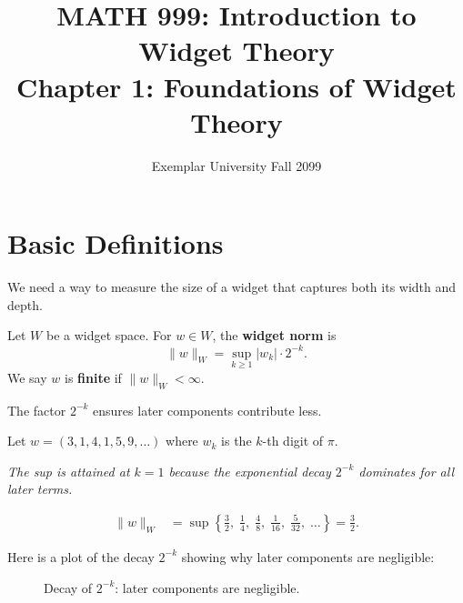 \documentclass[10pt, a4paper]{article}
\title{\textbf{MATH 999: Introduction to Widget Theory}\\[4pt]
  {\Large Chapter 1: Foundations of Widget Theory}}
\author{{\small Exemplar University \quad Fall 2099}}
\date{}
\newcommand{\note}[1]{\par{\small\textit{#1}}\par}
\theoremstyle{definition}
\theoremstyle{remark}
\begin{document}
\maketitle
\thispagestyle{fancy}
\tableofcontents
\newpage


\section{Basic Definitions}

We need a way to measure the size of a widget that captures both its
width and depth.

\begin{defbox}
Let $W$ be a widget space. For $w \in W$, the \textbf{widget norm} is
\[
  \|w\|_W = \sup_{k \ge 1} |w_k| \cdot 2^{-k}.
\]
We say $w$ is \textbf{finite} if $\|w\|_W < \infty$.
\end{defbox}

The factor $2^{-k}$ ensures later components contribute less.

\begin{exbox}
Let $w = (3, 1, 4, 1, 5, 9, \ldots)$ where $w_k$ is the $k$-th digit of $\pi$.
\note{The sup is attained at $k=1$ because the exponential decay $2^{-k}$ dominates for all later terms.}
\begin{align*}
  \|w\|_W &= \sup\!\left\{\frac{3}{2},\; \frac{1}{4},\; \frac{4}{8},\;
             \frac{1}{16},\; \frac{5}{32},\; \ldots\right\}
          = \frac{3}{2}.
\end{align*}
\end{exbox}


Here is a plot of the decay $2^{-k}$ showing why later components
are negligible:

\begin{figure}[H]
\centering
{}
\caption{Decay of $2^{-k}$: later components are negligible.}\label{fig:decay}
\end{figure}
\end{document}
